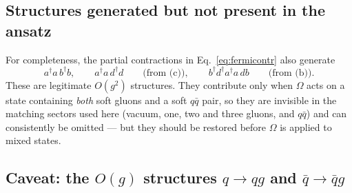 \documentclass[11pt]{article}
\newcommand{\dg}{\dagger}
\newcommand{\OM}{\Omega}
\begin{document}
\subsection{Structures generated but not present in the ansatz}

For completeness, the partial contractions in Eq.~\eqref{eq:fermicontr} also generate
\begin{equation}
a^{\dg}a\,b^{\dg}b,\qquad a^{\dg}a\,d^{\dg}d\qquad\text{(from (c))},
\qquad
b^{\dg}d^{\dg}a^{\dg}a\,db\qquad\text{(from (b))} .
\end{equation}
These are legitimate $O(g^{2})$ structures. They contribute only when $\OM$ acts on a state
containing \emph{both} soft gluons and a soft $q\bar q$ pair, so they are invisible in the
matching sectors used here (vacuum, one, two and three gluons, and $q\bar q$) and can consistently
be omitted --- but they should be restored before $\OM$ is applied to mixed states.

\subsection{Caveat: the $O(g)$ structures $q\to qg$ and $\bar q\to\bar q g$}
\label{sec:FG}
\end{document}
